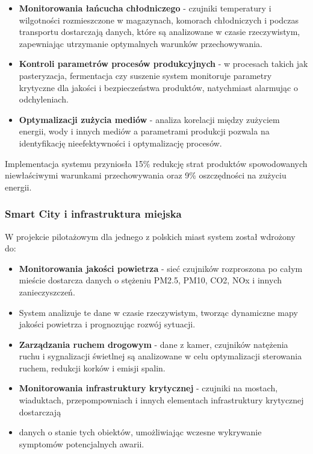 \begin{itemize}
    \item \textbf{Monitorowania łańcucha chłodniczego} - czujniki temperatury i wilgotności rozmieszczone w magazynach, komorach chłodniczych i podczas transportu dostarczają danych, które są analizowane w czasie rzeczywistym, zapewniając utrzymanie optymalnych warunków przechowywania.
    \item \textbf{Kontroli parametrów procesów produkcyjnych} - w procesach takich jak pasteryzacja, fermentacja czy suszenie system monitoruje parametry krytyczne dla jakości i bezpieczeństwa produktów, natychmiast alarmując o odchyleniach.
    \item \textbf{Optymalizacji zużycia mediów} - analiza korelacji między zużyciem energii, wody i innych mediów a parametrami produkcji pozwala na identyfikację nieefektywności i optymalizację procesów.
\end{itemize}

Implementacja systemu przyniosła 15\% redukcję strat produktów spowodowanych niewłaściwymi warunkami przechowywania oraz 9\% oszczędności na zużyciu energii.

\subsubsection{Smart City i infrastruktura miejska}
\label{subsubsec:smart_city}

W projekcie pilotażowym dla jednego z polskich miast system został wdrożony do:

\begin{itemize}
    \item \textbf{Monitorowania jakości powietrza} - sieć czujników rozproszona po całym mieście dostarcza danych o stężeniu PM2.5, PM10, CO2, NOx i innych zanieczyszczeń.
    \item System analizuje te dane w czasie rzeczywistym, tworząc dynamiczne mapy jakości powietrza i prognozując rozwój sytuacji.
    \item \textbf{Zarządzania ruchem drogowym} - dane z kamer, czujników natężenia ruchu i sygnalizacji świetlnej są analizowane w celu optymalizacji sterowania ruchem, redukcji korków i emisji spalin.
    \item \textbf{Monitorowania infrastruktury krytycznej} - czujniki na mostach, wiaduktach, przepompowniach i innych elementach infrastruktury krytycznej dostarczają
    \item danych o stanie tych obiektów, umożliwiając wczesne wykrywanie symptomów potencjalnych awarii.
\end{itemize}

